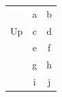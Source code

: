 \documentclass{article}
\begin{document}
\begin{tabular}{lcc}
\hline
 & a & b \\
\multirow{-2}{*}{Up} & c & d \\
\hline
\rowcolor{gray!20} & e & f \\
\rowcolor{gray!20} & g & h \\
\rowcolor{gray!20} \multirow{-3}{*}{Low} & i & j \\
\hline
\end{tabular}
\end{document}
